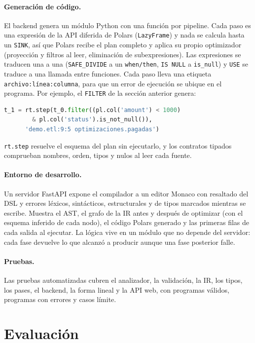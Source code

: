\documentclass[sigplan,screen,nonacm]{acmart}
\begin{document}
\paragraph{Generación de código.}
El backend genera un módulo Python con una función por pipeline. Cada paso es una expresión
de la API diferida de Polars (\texttt{LazyFrame}) y nada se calcula hasta un \texttt{SINK},
así que Polars recibe el plan completo y aplica su propio optimizador (proyección y filtros
al leer, eliminación de subexpresiones). Las expresiones se traducen una a una
(\texttt{SAFE\_DIVIDE} a un \texttt{when/then}, \texttt{IS NULL} a \texttt{is\_null}) y
\texttt{USE} se traduce a una llamada entre funciones. Cada paso lleva una etiqueta
\texttt{archivo:línea:columna}, para que un error de ejecución se ubique en el programa. Por
ejemplo, el \texttt{FILTER} de la sección anterior genera:
\begin{lstlisting}[language=Python]
t_1 = rt.step(t_0.filter((pl.col('amount') < 1000)
        & pl.col('status').is_not_null()),
      'demo.etl:9:5 optimizaciones.pagadas')
\end{lstlisting}
\texttt{rt.step} resuelve el esquema del plan sin ejecutarlo, y los contratos tipados
comprueban nombres, orden, tipos y nulos al leer cada fuente.

\paragraph{Entorno de desarrollo.}
Un servidor FastAPI expone el compilador a un editor Monaco con resaltado del DSL y errores
léxicos, sintácticos, estructurales y de tipos marcados mientras se escribe. Muestra el AST,
el grafo de la IR antes y después de optimizar (con el esquema inferido de cada nodo), el
código Polars generado y las primeras filas de cada salida al ejecutar. La lógica vive en un
módulo que no depende del servidor: cada fase devuelve lo que alcanzó a producir aunque una
fase posterior falle.

\paragraph{Pruebas.}
Las pruebas automatizadas cubren el analizador, la validación, la IR, los tipos, los pases, el backend, la
forma lineal y la API web, con programas válidos, programas con errores y casos límite.

\section{Evaluación}
\label{sec:eval}
\end{document}
